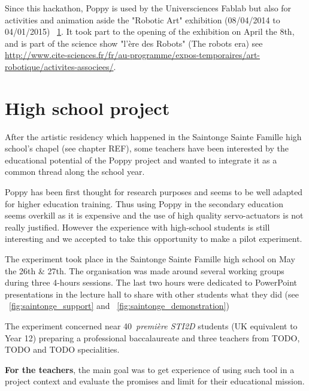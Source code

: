 Since this hackathon, Poppy is used by the Universciences Fablab but also for activities and animation aside the "Robotic Art" exhibition (08/04/2014 to 04/01/2015) \figurename~\ref{fig:universcience_art}. It took part to the opening of the exhibition on April the 8th, and is part of the science show "l'ère des Robots" (The robots era) see \url{http://www.cite-sciences.fr/fr/au-programme/expos-temporaires/art-robotique/activites-associees/}.

\begin{figure}[]
\centering
    \hfil
    \caption{}
    \label{fig:universcience_art}
\end{figure}


\section{High school project} %


After the artistic residency which happened in the Saintonge Sainte Famille high school's chapel (see chapter REF), some teachers have been interested by the educational potential of the Poppy project and wanted to integrate it as a common thread along the school year.

Poppy has been first thought for research purposes and seems to be well adapted for higher education training. Thus using Poppy in the secondary education seems overkill as it is expensive and the use of high quality servo-actuators is not really justified. However the experience with high-school students is still interesting and we accepted to take this opportunity to make a pilot experiment.


The experiment took place in the Saintonge Sainte Famille high school on May the 26th \& 27th. The organisation was made around several working groups during three 4-hours sessions. The last two hours were dedicated to PowerPoint presentations in the lecture hall to share with other students what they did (see \figurename~\ref{fig:saintonge_support} and \figurename~\ref{fig:saintonge_demonstration})

The experiment concerned near 40~\emph{première STI2D} students (UK equivalent to Year 12) preparing a professional baccalaureate and three teachers from TODO, TODO and TODO specialities.

\textbf{For the teachers}, the main goal was to get experience of using such tool in a project context and evaluate the promises and limit for their educational mission.

